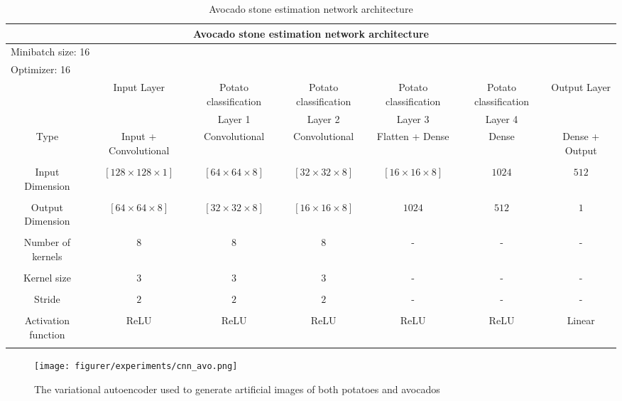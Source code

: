 \documentclass[11pt]{article}
\begin{document}
  \begin{table}[h!]
  \centering
  \begin{adjustbox}{max width=\textwidth}
  \begin{tabular}{*{7}{c}}%
  \hline
  \multicolumn{7}{c}{Avocado stone estimation network architecture}
  \\
  \hline
  \multicolumn{7}{l}{Minibatch size: 16} \\
  \multicolumn{7}{l}{Optimizer: 16} \\
  \hline
   & Input Layer & Potato classification & Potato classification & Potato classification & Potato classification & Output Layer \\
   & & Layer 1 & Layer 2 & Layer 3 & Layer 4 & \\
  \hline
  \hline
  Type & Input + Convolutional & Convolutional & Convolutional &  Flatten + Dense &  Dense & Dense + Output \\ \\
  \hline
  Input Dimension &  $[128 \times 128 \times 1]$ &  $[64 \times 64 \times 8]$ &  $[32 \times 32 \times 8]$ &  $[16 \times 16 \times 8]$ & $1024$ & $512$\\ \\
  \hline
  Output Dimension & $[64 \times 64 \times 8]$ &  $[32 \times 32 \times 8]$ &  $[16 \times 16 \times 8]$ & $1024$ & $512$ & $1$ \\ \\
  \hline
  Number of kernels & $8$ & $8$ & $8$ & - & - & - \\ \\
  \hline
  Kernel size & $3$ & $3$ & $3$ & - & - & - \\ \\
  \hline
  Stride & $2$ & $2$ & $2$ & - & - & - \\ \\
  \hline
  Activation function & ReLU & ReLU & ReLU & ReLU & ReLU & Linear \\ \\
  \hline
\end{tabular}
\end{adjustbox}
  \caption{Avocado stone estimation network architecture}
  \label{tab:experiments_avo_cnn}
\end{table}




\begin{figure}[!h]
    \centering
    \texttt{[image: figurer/experiments/cnn\_avo.png]}
    \caption{The variational autoencoder used to generate artificial images of both potatoes and avocados}
    \label{fig:experiment_cnn_potato}
\end{figure}
\end{document}

